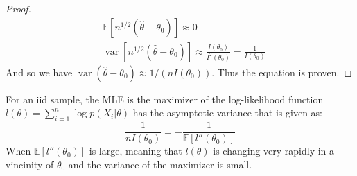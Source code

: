 \begin{proof}
    \begin{equation*}
    \begin{aligned}
        &\mathbb{E}[n^{1/2}(\hat{\theta} - \theta_0)] \approx 0 \\
        &\operatorname{var}[n^{1/2}(\hat{\theta} - \theta_0)] \approx \frac{I(\theta_0)}{I^2(\theta_0)} = \frac{1}{I(\theta_0)}
    \end{aligned}
    \end{equation*}
    And so we have $\operatorname{var}(\hat{\theta} - \theta_0)\approx 1/(nI(\theta_0))$. 
    Thus the equation is proven.
\end{proof}

\begin{remark}
    For an iid sample, the MLE is the maximizer of the log-likelihood function $l(\theta) = \sum^n_{i=1}\log p(X_i|\theta)$ has the asymptotic variance that is given as:
    \begin{equation*}
        \frac{1}{nI(\theta_0)} = -\frac{1}{\mathbb{E}[l''(\theta_0)]}
    \end{equation*}
    When $\mathbb{E}[l''(\theta_0)]$ is large, meaning that $l(\theta)$ is changing very rapidly in a vincinity of $\theta_0$ and the variance of the maximizer is small. 
\end{remark}

